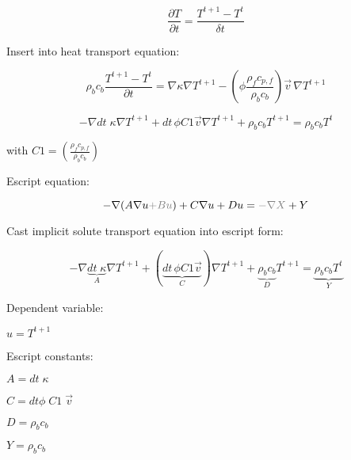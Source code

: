 \documentclass[11pt]{article}
\begin{document}
\begin{equation}
    \frac{ \partial T } {\partial t} = \frac { T^{t+1} - T^t} {\delta t}
\end{equation}

Insert into heat transport equation:

\begin{equation}
	\rho _b c_b \frac { T^{t+1} - T^t} {\partial t} = \nabla \kappa \nabla T^{t+1} - \left( \phi \frac{ \rho_{f} c_{p,f}} {\rho_{b} c_{b} } \right) \vec v \, \nabla T^{t+1}
\end{equation}

\begin{equation}
    - \nabla dt \; \kappa \nabla T^{t+1} + dt \, \phi  C1 \vec{v} \nabla T^{t+1} + \rho_b c_b T^{t+1}  =  \rho_b c_b T^t 
\end{equation}

with $C1 = \left( \frac{ \rho_{f} c_{p,f}} {\rho_{b} c_{b}} \right ) $

Escript equation:

\begin{equation}
     - \nabla (A \nabla u {\color{gray}+ B u }) + C \nabla u + D u  = {\color{gray}- \nabla X } + Y
\end{equation}

Cast implicit solute transport equation into escript form:

\begin{equation}
    - \nabla \underbrace{ dt \; \kappa}_A \nabla T^{t+1} + ( \underbrace{ dt \, \phi  C1 \vec{v}}_C ) \nabla T^{t+1} + \underbrace{\rho_b c_b}_D T^{t+1}  =  \underbrace{\rho_b c_b T^t}_Y
\end{equation}

Dependent variable:

$ u = T^{t+1} $

Escript constants:

$ A = dt \; \kappa $

$ C = dt \phi \; C1 \; \vec{v} $

$ D = \rho_b c_b $

$ Y = \rho_b c_b $


\pagebreak





\end{document}

